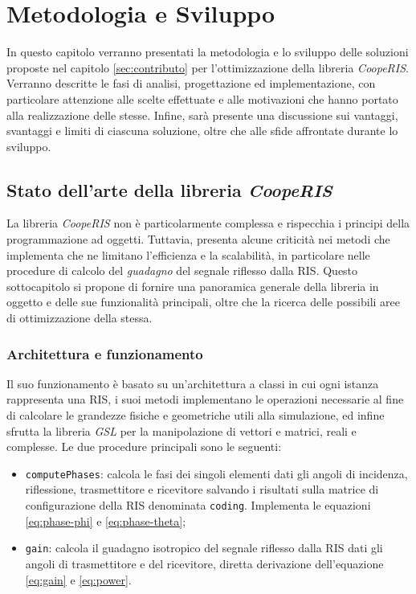 \chapter{Metodologia e Sviluppo}
\label{ch:metodologiasviluppo}

In questo capitolo verranno presentati la metodologia e lo sviluppo delle
soluzioni proposte nel capitolo \ref{sec:contributo} per l'ottimizzazione della
libreria \textit{CoopeRIS}. Verranno descritte le fasi di analisi, progettazione
ed implementazione, con particolare attenzione alle scelte effettuate e alle
motivazioni che hanno portato alla realizzazione delle stesse. Infine, sarà
presente una discussione sui vantaggi, svantaggi e limiti di ciascuna soluzione,
oltre che alle sfide affrontate durante lo sviluppo.

\section{Stato dell'arte della libreria \textit{CoopeRIS}}
\label{sec:libreria}

La libreria \textit{CoopeRIS} non è particolarmente complessa e rispecchia i
principi della programmazione ad oggetti. Tuttavia, presenta alcune criticità
nei metodi che implementa che ne limitano l'efficienza e la scalabilità, in particolare
nelle procedure di calcolo del \textit{guadagno} del segnale riflesso dalla RIS.
Questo sottocapitolo si propone di fornire una panoramica generale della libreria
in oggetto e delle sue funzionalità principali, oltre che la ricerca delle
possibili aree di ottimizzazione della stessa.

\subsection{Architettura e funzionamento}
\label{sec:architettura}

Il suo funzionamento è basato su un'architettura a classi in cui ogni istanza rappresenta
una RIS, i suoi metodi implementano le operazioni necessarie al fine di
calcolare le grandezze fisiche e geometriche utili alla simulazione, ed infine sfrutta
la libreria \textit{GSL}\cite{gnugsl} per la manipolazione di vettori e matrici,
reali e complesse. Le due procedure principali sono le seguenti:

\begin{itemize}
  \item \texttt{computePhases}: calcola le fasi dei singoli elementi dati gli angoli
    di incidenza, riflessione, trasmettitore e ricevitore salvando i risultati sulla
    matrice di configurazione della RIS denominata \texttt{coding}. Implementa le
    equazioni \ref{eq:phase-phi} e \ref{eq:phase-theta};

  \item \texttt{gain}: calcola il guadagno isotropico del segnale riflesso dalla
    RIS dati gli angoli di trasmettitore e del ricevitore, diretta derivazione
    dell'equazione \ref{eq:gain} e \ref{eq:power}.
\end{itemize}

